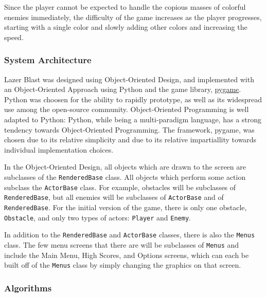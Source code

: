 Since the player cannot be expected to handle the copious masses
of colorful enemies immediately, the difficulty of the game increases
as the player progresses, starting with a single color and slowly
adding other colors and increasing the speed.

\subsubsection*{System Architecture}
Lazer Blast was designed using Object-Oriented Design, and implemented
with an Object-Oriented Approach using Python and the game library,
\href{http://pygame.org/news}{pygame}.  Python was choosen for the
ability to rapidly prototype, as well as its widespread use among
the open-source community.  Object-Oriented Programming is well
adapted to Python: Python, while being a multi-paradigm language,
has a strong tendency towards Object-Oriented Programming.  The
framework, pygame, was chosen due to its relative simplicity and due
to its relative impartiallity towards individual implementation choices.

In the Object-Oriented Design, all objects which are drawn to the screen
are subclasses of the \texttt{RenderedBase} class.  All
objects which perform some action subclass the \texttt{ActorBase}
class.  For example, obstacles will be subclasses of
\texttt{RenderedBase}, but all enemies will be subclasses of
\texttt{ActorBase} and of \texttt{RenderedBase}.
For the initial version of the game, there is only one obstacle,
\texttt{Obstacle}, and only two types of actors:
\texttt{Player} and \texttt{Enemy}.


In addition to the \texttt{RenderedBase} and
\texttt{ActorBase} classes, there is also the
\texttt{Menus} class. The few menu screens that there are
will be subclasses of \texttt{Menus} and include the Main
Menu, High Scores, and Options screens, which can each be built off of
the \texttt{Menus} class by simply changing the graphics
on that screen.

\subsubsection*{Algorithms}

